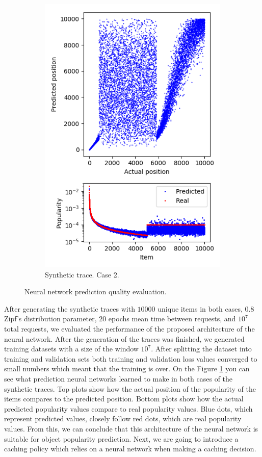 \begin{figure}[b!]
\begin{subfigure}[b]{0.49\linewidth}
		\includegraphics[width=\linewidth]{pics/case2_op.png}
		\caption{Synthetic trace. Case 2.}
	\end{subfigure}
	\caption{Neural network prediction quality evaluation.}
	\label{fig:nn2}
\end{figure}

After generating the synthetic traces with $ 10000 $ unique items in both cases, $ 0.8 $ Zipf's distribution parameter, $ 20 $ epochs mean time between requests, and $ 10^7 $ total requests, we evaluated the performance of the proposed architecture of the neural network. After the generation of the traces was finished, we generated training datasets with a size of the window $ 10^7 $. After splitting the dataset into training and validation sets both training and validation loss values converged to small numbers which meant that the training is over. On the Figure \ref{fig:nn2} you can see what prediction neural networks learned to make in both cases of the synthetic traces. Top plots show how the actual position of the popularity of the items compares to the predicted position. Bottom plots show how the actual predicted popularity values compare to real popularity values. Blue dots, which represent predicted values, closely follow red dots, which are real popularity values. From this, we can conclude that this architecture of the neural network is suitable for object popularity prediction. Next, we are going to introduce a caching policy which relies on a neural network when making a caching decision.